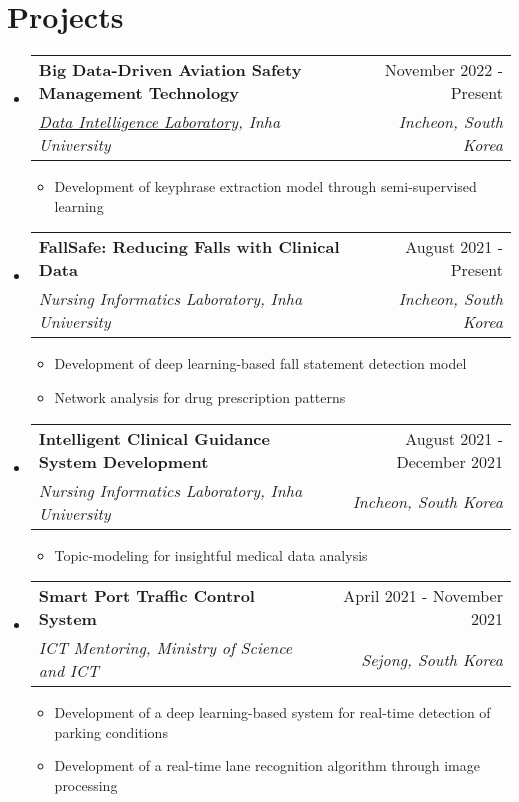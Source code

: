 \documentclass[letterpaper,11pt]{article}
\makeatletter
\newcommand{\resumeSubheading}[4]{
  \vspace{-1pt}\item
    \begin{tabular*}{0.97\textwidth}{l@{\extracolsep{\fill}}r}
      #1 & #2 \\
      \textit{\small#3} & \textit{\small #4} \\
    \end{tabular*}\vspace{-5pt}
}
\makeatother
\begin{document}
    \section{Projects}
    \begin{itemize}[leftmargin=*,label=]
        \resumeSubheading
        {\textbf{Big Data-Driven Aviation Safety Management Technology}}{November 2022 - Present}
            {\href{http://dilab.inha.ac.kr/}{Data Intelligence Laboratory}, Inha University}{Incheon, South Korea}
            \begin{itemize}[label=\bullet]
                \item{Development of keyphrase extraction model through semi-supervised learning}
            \end{itemize}
        \resumeSubheading
        {\textbf{FallSafe: Reducing Falls with Clinical Data}}{August 2021 - Present}
            {Nursing Informatics Laboratory, Inha University}{Incheon, South Korea}
            \begin{itemize}[label=\bullet]
                \item{Development of deep learning-based fall statement detection model}
                \item{Network analysis for drug prescription patterns}
            \end{itemize}
        \resumeSubheading
        {\textbf{Intelligent Clinical Guidance System Development}}{August 2021 - December 2021}
            {Nursing Informatics Laboratory, Inha University}{Incheon, South Korea}
            \begin{itemize}[label=\bullet]
                \item{Topic-modeling for insightful medical data analysis}
            \end{itemize}
        \resumeSubheading
        {\textbf{Smart Port Traffic Control System}}{April 2021 - November 2021}
            {ICT Mentoring, Ministry of Science and ICT}{Sejong, South Korea}
            \begin{itemize}[label=\bullet]
                \item{Development of a deep learning-based system for real-time detection of parking conditions}
                \item{Development of a real-time lane recognition algorithm through image processing}
            \end{itemize}
    \end{itemize}
    
\end{document}
